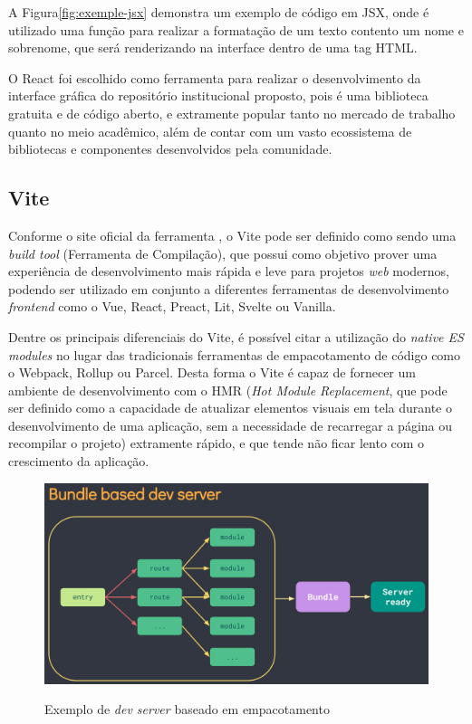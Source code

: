 A Figura\ref{fig:exemple-jsx} demonstra um exemplo de código em JSX, onde é
utilizado uma função para realizar a formatação de um texto contento um
nome e sobrenome, que será renderizando na interface dentro de uma
tag HTML.

O React foi escolhido como ferramenta para realizar o desenvolvimento da
interface gráfica do repositório institucional proposto, pois é uma biblioteca
gratuita e de código aberto, e extramente popular tanto no mercado de trabalho
quanto no meio acadêmico, além de contar com um vasto ecossistema de bibliotecas
e componentes desenvolvidos pela comunidade.


\subsection{Vite}

Conforme o site oficial da ferramenta \cite{Vite:2022}, o Vite pode ser definido
como sendo uma \emph{build tool} (Ferramenta de Compilação), que possui como objetivo
prover uma experiência de desenvolvimento mais rápida e leve para projetos
\emph{web} modernos, podendo ser utilizado em conjunto a diferentes ferramentas de
desenvolvimento \emph{frontend} como o Vue, React, Preact, Lit, Svelte ou Vanilla.

Dentre os principais diferenciais do Vite, é possível citar a utilização do
\emph{native ES modules} no lugar das tradicionais ferramentas de empacotamento
de código como o Webpack, Rollup ou Parcel. Desta forma o Vite é capaz de
fornecer um ambiente de desenvolvimento com o HMR (\emph{Hot Module Replacement},
que pode ser definido como a capacidade de atualizar elementos visuais em tela
durante o desenvolvimento de uma aplicação, sem a necessidade de recarregar a
página ou recompilar o projeto) extramente rápido, e que tende não ficar lento
com o crescimento da aplicação.

\begin{figure}[htb]
    \caption{Exemplo de \emph{dev server} baseado em empacotamento}
    \centering
    \includegraphics[scale=0.33]{img/bundle-based.png}
    \label{fig:bundle-based}
\end{figure}


